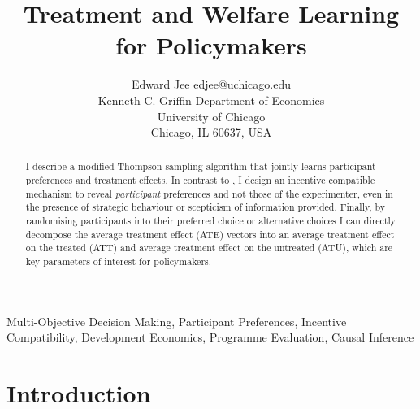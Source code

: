 \documentclass[twoside,11pt]{article}
\begin{document}
\title{
  Treatment and Welfare Learning for Policymakers
}

\author{\name Edward Jee \email edjee@uchicago.edu \\
       \addr Kenneth C. Griffin Department of Economics\\
       University of Chicago\\
       Chicago, IL 60637, USA}


\maketitle

\begin{abstract}%
I describe a modified Thompson sampling algorithm that jointly learns participant preferences and treatment 
effects. In contrast to \cite{lin2022preference}, I design an incentive 
compatible mechanism to reveal \emph{participant} preferences and not those of 
the experimenter, even in the presence of strategic behaviour 
or scepticism of information 
provided. Finally, by randomising 
participants into their preferred choice or alternative choices I can directly 
decompose the average treatment effect (ATE) vectors into an average treatment 
effect on the treated (ATT) and average treatment effect on the untreated (ATU), 
which are key parameters of interest for policymakers. 
\end{abstract}

\begin{keywords}
 Multi-Objective Decision Making, Participant Preferences, Incentive Compatibility, 
 Development Economics, Programme Evaluation, Causal Inference 
\end{keywords}

\section{Introduction}
\end{document}
